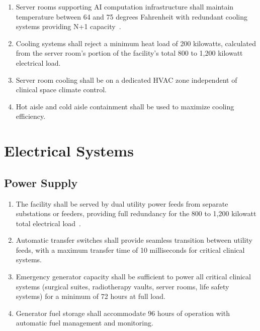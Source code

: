 \documentclass[11pt,letterpaper]{article}
\begin{document}
\begin{enumerate}[label=(\alph*)]
\item Server rooms supporting AI computation infrastructure shall maintain
  temperature between 64 and 75 degrees Fahrenheit with redundant cooling
  systems providing N+1 capacity~\cite{sitespec2026}.

\item Cooling systems shall reject a minimum heat load of 200 kilowatts,
  calculated from the server room's portion of the facility's total 800 to
  1,200 kilowatt electrical load.

\item Server room cooling shall be on a dedicated HVAC zone independent of
  clinical space climate control.

\item Hot aisle and cold aisle containment shall be used to maximize cooling
  efficiency.
\end{enumerate}

\section{Electrical Systems}

\subsection{Power Supply}

\begin{enumerate}[label=(\alph*)]
\item The facility shall be served by dual utility power feeds from separate
  substations or feeders, providing full redundancy for the 800 to 1,200
  kilowatt total electrical load~\cite{sitespec2026}.

\item Automatic transfer switches shall provide seamless transition between
  utility feeds, with a maximum transfer time of 10 milliseconds for critical
  clinical systems.

\item Emergency generator capacity shall be sufficient to power all critical
  clinical systems (surgical suites, radiotherapy vaults, server rooms,
  life safety systems) for a minimum of 72 hours at full load.

\item Generator fuel storage shall accommodate 96 hours of operation with
  automatic fuel management and monitoring.
\end{enumerate}
\end{document}
